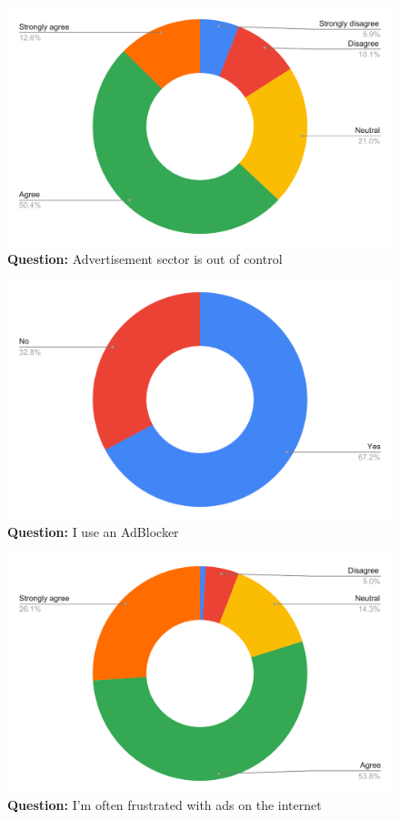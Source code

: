 \begin{figure}[H]
  \centering
  \includegraphics[width=13cm]{thesis/paper/images/p1_q3.pdf}
  \textbf{Question:} Advertisement sector is out of control
\end{figure}

\begin{figure}[H]
  \centering
  \includegraphics[width=13cm]{thesis/paper/images/p1_q4.pdf}
  \textbf{Question:} I use an AdBlocker
\end{figure}

\begin{figure}[H]
  \centering
  \includegraphics[width=13cm]{thesis/paper/images/p1_q5.pdf}
  \textbf{Question:} I'm often frustrated with ads on the internet
\end{figure}

